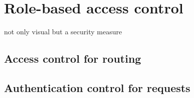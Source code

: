 \section{Role-based access control} not only visual but a security measure

\subsection{Access control for routing}

\subsection{Authentication control for requests}

